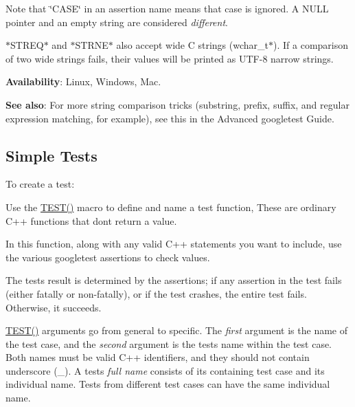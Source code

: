 Note that \char`\"{}\+C\+A\+S\+E\char`\"{} in an assertion name means that case is ignored. A {\ttfamily N\+U\+LL} pointer and an empty string are considered {\itshape different}.

{\ttfamily $\ast$\+S\+T\+R\+E\+Q$\ast$} and {\ttfamily $\ast$\+S\+T\+R\+N\+E$\ast$} also accept wide C strings ({\ttfamily wchar\+\_\+t$\ast$}). If a comparison of two wide strings fails, their values will be printed as U\+T\+F-\/8 narrow strings.

{\bfseries{Availability}}\+: Linux, Windows, Mac.

{\bfseries{See also}}\+: For more string comparison tricks (substring, prefix, suffix, and regular expression matching, for example), see this in the Advanced googletest Guide.

\subsection*{Simple Tests}

To create a test\+:


\begin{DoxyEnumerate}
\item Use the {\ttfamily \mbox{\hyperlink{googletest-master_2googletest_2include_2gtest_2gtest_8h_ab5540a6d621853916be8240ff51819cf}{T\+E\+S\+T()}}} macro to define and name a test function, These are ordinary C++ functions that don\textquotesingle{}t return a value.
\end{DoxyEnumerate}
\begin{DoxyEnumerate}
\item In this function, along with any valid C++ statements you want to include, use the various googletest assertions to check values.
\end{DoxyEnumerate}
\begin{DoxyEnumerate}
\item The test\textquotesingle{}s result is determined by the assertions; if any assertion in the test fails (either fatally or non-\/fatally), or if the test crashes, the entire test fails. Otherwise, it succeeds.
\end{DoxyEnumerate}


\begin{DoxyCode}{0}
\DoxyCodeLine{\}}
\end{DoxyCode}


{\ttfamily \mbox{\hyperlink{googletest-master_2googletest_2include_2gtest_2gtest_8h_ab5540a6d621853916be8240ff51819cf}{T\+E\+S\+T()}}} arguments go from general to specific. The {\itshape first} argument is the name of the test case, and the {\itshape second} argument is the test\textquotesingle{}s name within the test case. Both names must be valid C++ identifiers, and they should not contain underscore ({\ttfamily \+\_\+}). A test\textquotesingle{}s {\itshape full name} consists of its containing test case and its individual name. Tests from different test cases can have the same individual name.

